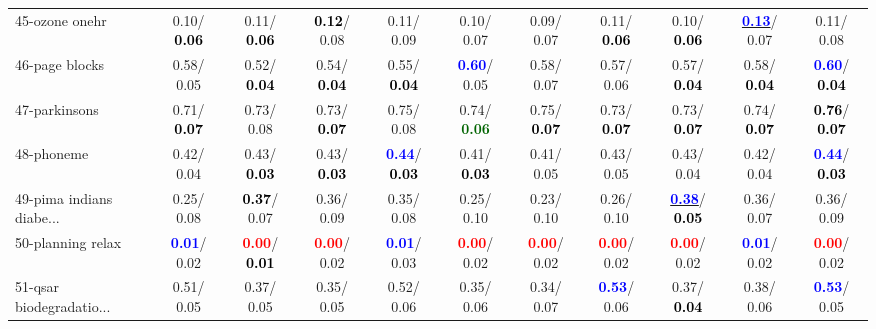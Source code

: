 \begin{table}[h]
\begin{center}
{\begin{tabular}{lc|c|c|c|c|c|c|c|c|c}
45-ozone onehr &   0.10/\textcolor{black}{\textbf{  0.06}} &   0.11/\textcolor{black}{\textbf{  0.06}} & \textcolor{black}{\textbf{  0.12}}/  0.08 &   0.11/  0.09 &   0.10/  0.07 &   0.09/  0.07 &   0.11/\textcolor{black}{\textbf{  0.06}} &   0.10/\textcolor{black}{\textbf{  0.06}} & \underline{\textcolor{blue}{\textbf{  0.13}}}/  0.07 &   0.11/  0.08 \\
46-page blocks &   0.58/  0.05 &   0.52/\textcolor{black}{\textbf{  0.04}} &   0.54/\textcolor{black}{\textbf{  0.04}} &   0.55/\textcolor{black}{\textbf{  0.04}} & \textcolor{blue}{\textbf{  0.60}}/  0.05 &   0.58/  0.07 &   0.57/  0.06 &   0.57/\textcolor{black}{\textbf{  0.04}} &   0.58/\textcolor{black}{\textbf{  0.04}} & \textcolor{blue}{\textbf{  0.60}}/\textcolor{black}{\textbf{  0.04}} \\ \hline
47-parkinsons &   0.71/\textcolor{black}{\textbf{  0.07}} &   0.73/  0.08 &   0.73/\textcolor{black}{\textbf{  0.07}} &   0.75/  0.08 &   0.74/\textcolor{darkgreen}{\textbf{  0.06}} &   0.75/\textcolor{black}{\textbf{  0.07}} &   0.73/\textcolor{black}{\textbf{  0.07}} &   0.73/\textcolor{black}{\textbf{  0.07}} &   0.74/\textcolor{black}{\textbf{  0.07}} & \textcolor{black}{\textbf{  0.76}}/\textcolor{black}{\textbf{  0.07}} \\
48-phoneme &   0.42/  0.04 &   0.43/\textcolor{black}{\textbf{  0.03}} &   0.43/\textcolor{black}{\textbf{  0.03}} & \textcolor{blue}{\textbf{  0.44}}/\textcolor{black}{\textbf{  0.03}} &   0.41/\textcolor{black}{\textbf{  0.03}} &   0.41/  0.05 &   0.43/  0.05 &   0.43/  0.04 &   0.42/  0.04 & \textcolor{blue}{\textbf{  0.44}}/\textcolor{black}{\textbf{  0.03}} \\
49-pima indians diabe... &   0.25/  0.08 & \textcolor{black}{\textbf{  0.37}}/  0.07 &   0.36/  0.09 &   0.35/  0.08 &   0.25/  0.10 &   0.23/  0.10 &   0.26/  0.10 & \underline{\textcolor{blue}{\textbf{  0.38}}}/\textcolor{black}{\textbf{  0.05}} &   0.36/  0.07 &   0.36/  0.09 \\
50-planning relax & \textcolor{blue}{\textbf{  0.01}}/  0.02 & \textcolor{red}{\textbf{  0.00}}/\textcolor{black}{\textbf{  0.01}} & \textcolor{red}{\textbf{  0.00}}/  0.02 & \textcolor{blue}{\textbf{  0.01}}/  0.03 & \textcolor{red}{\textbf{  0.00}}/  0.02 & \textcolor{red}{\textbf{  0.00}}/  0.02 & \textcolor{red}{\textbf{  0.00}}/  0.02 & \textcolor{red}{\textbf{  0.00}}/  0.02 & \textcolor{blue}{\textbf{  0.01}}/  0.02 & \textcolor{red}{\textbf{  0.00}}/  0.02 \\
51-qsar biodegradatio... &   0.51/  0.05 &   0.37/  0.05 &   0.35/  0.05 &   0.52/  0.06 &   0.35/  0.06 &   0.34/  0.07 & \textcolor{blue}{\textbf{  0.53}}/  0.06 &   0.37/\textcolor{black}{\textbf{  0.04}} &   0.38/  0.06 & \textcolor{blue}{\textbf{  0.53}}/  0.05 \\

\end{tabular}}
\end{center}
\end{table}
